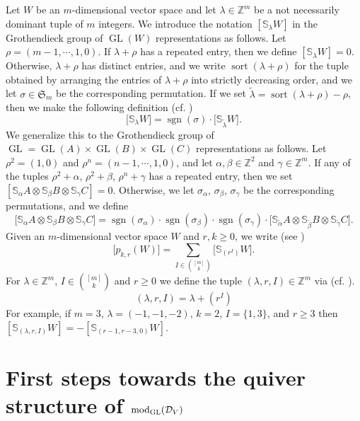 \documentclass[11pt,reqno]{amsart}
\newcommand{\D}{\mathcal{D}}
\newcommand{\oo}{\otimes}
\newcommand{\bS}{\mathbb{S}}
\newcommand{\tn}{\textnormal}
\newcommand{\GL}{\operatorname{GL}}
\newcommand{\bb}[1]{\mathbb{#1}}
\numberwithin{equation}{section}
\begin{document}
Let $W$ be an $m$-dimensional vector space and let $\lambda\in \mathbb{Z}^m$ be a not necessarily dominant tuple of $m$ integers. We introduce the notation $[\bS_{\lambda}W]$ in the Grothendieck group of $\GL(W)$ representations as follows. Let $\rho=(m-1,\cdots ,1,0)$. If $\lambda+\rho$ has a repeated entry, then we define $[\bS_{\lambda}W]=0$. Otherwise, $\lambda+\rho$ has distinct entries, and we write $\operatorname{sort}(\lambda+\rho)$ for the tuple obtained by arranging the entries of $\lambda+\rho$ into strictly decreasing order, and we let $\sigma \in \mathfrak{S}_m$ be the corresponding permutation. If we set $\tilde{\lambda}=\operatorname{sort}(\lambda+\rho)-\rho$, then we make the following definition (cf. \cite[Corollary 4.1.9]{weyman})
$$
\big[\bS_{\lambda}W\big]=\operatorname{sgn}(\sigma)\cdot \big[\bS_{\tilde{\lambda}}W\big].
$$
We generalize this to the Grothendieck group of $\GL=\GL(A)\times \GL(B)\times \GL(C)$ representations as follows. Let $\rho^2=(1,0)$ and $\rho^n=(n-1,\cdots, 1,0)$, and let $\alpha,\beta\in \mathbb{Z}^2$ and $\gamma \in \mathbb{Z}^m$. If any of the tuples $\rho^2+\alpha$, $\rho^2+\beta$, $\rho^n+\gamma$ has a repeated entry, then we set $[\bS_{\alpha}A\oo \bS_{\beta}B\oo \bS_{\gamma}C]=0$. Otherwise, we let $\sigma_{\alpha}$, $\sigma_{\beta}$, $\sigma_{\gamma}$ be the corresponding permutations, and we define
\begin{equation}\label{eq:bottGG}
\big[\bS_{\alpha}A\oo \bS_{\beta}B\oo \bS_{\gamma}C\big]=\operatorname{sgn}(\sigma_{\alpha})\cdot \operatorname{sgn}(\sigma_{\beta})\cdot \operatorname{sgn}(\sigma_{\gamma})\cdot \big[\bS_{\tilde{\alpha}}A\oo \bS_{\tilde{\beta}}B\oo \bS_{\tilde{\gamma}}C\big].
\end{equation}
Given an $m$-dimensional vector space $W$ and $r,k\geq 0$, we write (see \cite[Section 2.1.3, Lemma 2.5]{raicu2016characters})
\begin{equation}\label{eq:pkr}
\big[p_{k,r}(W)\big]=\sum_{I\in \binom{[m]}{k}} \big[\bS_{(r^I)}W\big].
\end{equation}
For $\lambda \in \mathbb{Z}^m$, $I\in \binom{[m]}{k}$ and $r\geq 0$ we define the tuple $(\lambda, r,I)\in\bb{Z}^m$ via (cf. \cite[Lemma 2.3]{raicu2016characters}).
\begin{equation}\label{eq:lambdaplusrI}
(\lambda, r,I)=\lambda+(r^I)
\end{equation}
For example, if $m=3$, $\lambda=(-1,-1,-2)$, $k=2$, $I=\{1,3\}$, and $r\geq 3$ then $[\bS_{(\lambda, r,I)}W]=-[\bS_{(r-1,r-3,0)}W]$.

\section{First steps towards the quiver structure of $\tn{mod}_{\GL}(\D_V)$} \label{sec:steps}
\end{document}
